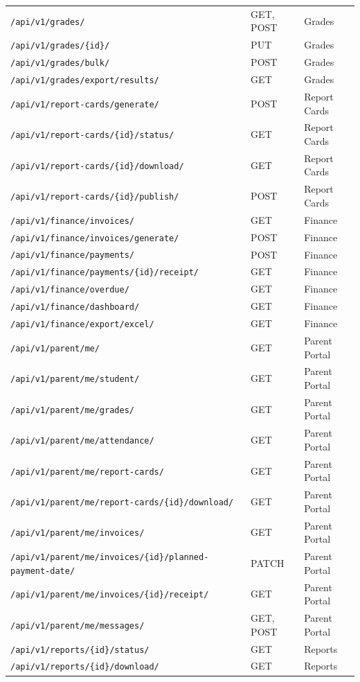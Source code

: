 \documentclass[11pt,a4paper]{article}
\newcommand{\endpoint}[2]{\texttt{#1} & #2}
\begin{document}
\begin{longtable}{@{}p{6.8cm}p{1.2cm}p{6.5cm}@{}}
\endpoint{/api/v1/grades/}{GET, POST} & Grades \\
\endpoint{/api/v1/grades/\{id\}/}{PUT} & Grades \\
\endpoint{/api/v1/grades/bulk/}{POST} & Grades \\
\endpoint{/api/v1/grades/export/results/}{GET} & Grades \\
\endpoint{/api/v1/report-cards/generate/}{POST} & Report Cards \\
\endpoint{/api/v1/report-cards/\{id\}/status/}{GET} & Report Cards \\
\endpoint{/api/v1/report-cards/\{id\}/download/}{GET} & Report Cards \\
\endpoint{/api/v1/report-cards/\{id\}/publish/}{POST} & Report Cards \\
\endpoint{/api/v1/finance/invoices/}{GET} & Finance \\
\endpoint{/api/v1/finance/invoices/generate/}{POST} & Finance \\
\endpoint{/api/v1/finance/payments/}{POST} & Finance \\
\endpoint{/api/v1/finance/payments/\{id\}/receipt/}{GET} & Finance \\
\endpoint{/api/v1/finance/overdue/}{GET} & Finance \\
\endpoint{/api/v1/finance/dashboard/}{GET} & Finance \\
\endpoint{/api/v1/finance/export/excel/}{GET} & Finance \\
\endpoint{/api/v1/parent/me/}{GET} & Parent Portal \\
\endpoint{/api/v1/parent/me/student/}{GET} & Parent Portal \\
\endpoint{/api/v1/parent/me/grades/}{GET} & Parent Portal \\
\endpoint{/api/v1/parent/me/attendance/}{GET} & Parent Portal \\
\endpoint{/api/v1/parent/me/report-cards/}{GET} & Parent Portal \\
\endpoint{/api/v1/parent/me/report-cards/\{id\}/download/}{GET} & Parent Portal \\
\endpoint{/api/v1/parent/me/invoices/}{GET} & Parent Portal \\
\endpoint{/api/v1/parent/me/invoices/\{id\}/planned-payment-date/}{PATCH} & Parent Portal \\
\endpoint{/api/v1/parent/me/invoices/\{id\}/receipt/}{GET} & Parent Portal \\
\endpoint{/api/v1/parent/me/messages/}{GET, POST} & Parent Portal \\
\endpoint{/api/v1/reports/\{id\}/status/}{GET} & Reports \\
\endpoint{/api/v1/reports/\{id\}/download/}{GET} & Reports \\
\bottomrule
\end{longtable}
\end{document}
